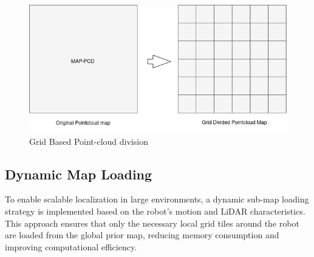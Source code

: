 \begin{figure}
    \centering
    \includegraphics[width=0.8
    \linewidth]{images/map.drawio.png}
    \caption{Grid Based Point-cloud division }
    \label{fig:pointcloud division}
\end{figure}
\subsection{Dynamic Map Loading}

To enable scalable localization in large environments, a dynamic sub-map loading strategy is implemented based on the robot's motion and LiDAR characteristics. This approach ensures that only the necessary local grid tiles around the robot are loaded from the global prior map, reducing memory consumption and improving computational efficiency.

